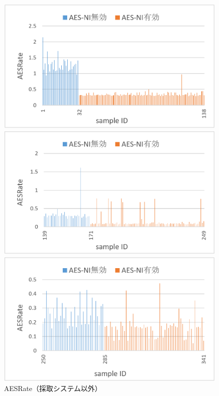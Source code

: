 \begin{figure}[H]
  \begin{minipage}[b]{0.45\linewidth}
    \centering
    \includegraphics[width=\textwidth,pagebox=cropbox]{fig/aes_rst_chrome.png}
  \end{minipage}
  \begin{minipage}[b]{0.45\linewidth}
    \centering
    \includegraphics[width=\textwidth,pagebox=cropbox]{fig/aes_rst_firefox.png}
  \end{minipage}
  \begin{minipage}[b]{0.45\linewidth}
    \centering
    \includegraphics[width=\textwidth,pagebox=cropbox]{fig/aes_rst_ie.png}
  \end{minipage}
  \caption{AESRate（採取システム以外）}\label{fig-aes_rst}
\end{figure}

